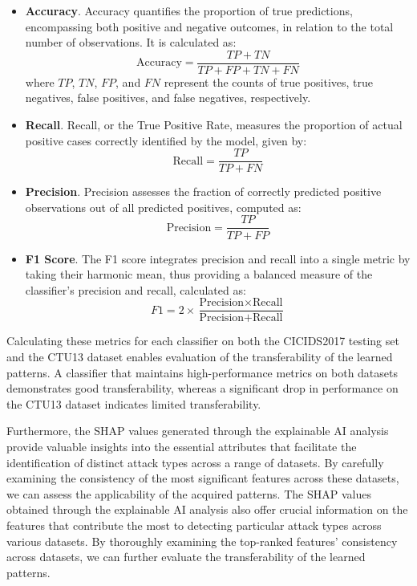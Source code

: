 \begin{itemize}
    \item \textbf{Accuracy}. Accuracy quantifies the proportion of true predictions, encompassing both positive and negative outcomes, in relation to the total number of observations. It is calculated as:
    \begin{equation}
    \text{Accuracy} = \frac{TP + TN}{TP + FP + TN + FN}
    \end{equation}
    where $TP$, $TN$, $FP$, and $FN$ represent the counts of true positives, true negatives, false positives, and false negatives, respectively.
    
    \item \textbf{Recall}. Recall, or the True Positive Rate, measures the proportion of actual positive cases correctly identified by the model, given by:
    \begin{equation}
    \text{Recall} = \frac{TP}{TP + FN}
    \end{equation}
    
    \item \textbf{Precision}. Precision assesses the fraction of correctly predicted positive observations out of all predicted positives, computed as:
    \begin{equation}
    \text{Precision} = \frac{TP}{TP + FP}
    \end{equation}
    
    \item \textbf{F1 Score}. The F1 score integrates precision and recall into a single metric by taking their harmonic mean, thus providing a balanced measure of the classifier's precision and recall, calculated as:
    \begin{equation}
    F1 = 2 \times \frac{\text{Precision} \times \text{Recall}}{\text{Precision} + \text{Recall}}
    \end{equation}
\end{itemize}

Calculating these metrics for each classifier on both the CICIDS2017 testing set and the CTU13 dataset enables evaluation of the transferability of the learned patterns. A classifier that maintains high-performance metrics on both datasets demonstrates good transferability, whereas a significant drop in performance on the CTU13 dataset indicates limited transferability.

Furthermore, the SHAP values generated through the explainable AI analysis provide valuable insights into the essential attributes that facilitate the identification of distinct attack types across a range of datasets. By carefully examining the consistency of the most significant features across these datasets, we can assess the applicability of the acquired patterns. The SHAP values obtained through the explainable AI analysis also offer crucial information on the features that contribute the most to detecting particular attack types across various datasets. By thoroughly examining the top-ranked features' consistency across datasets, we can further evaluate the transferability of the learned patterns.


